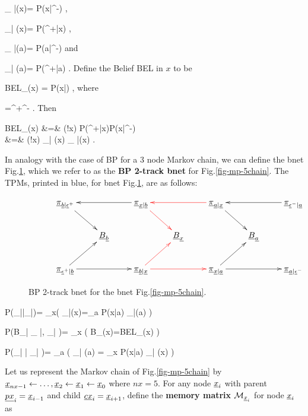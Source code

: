 \beq
\pi_{ \rvx|\rvb}(x)=
P(x|\eps^-)
\;,
\eeq

\beq
\pi_{\rvb| \rvx}(x)=
P(\eps^+|x)
\;,
\eeq

\beq
\pi_{ \rva|\rvx}(a)=
P(a|\eps^-)
\;
\eeq
and

\beq
\pi_{\rvx| \rva}(a)=
P(\eps^+|a)
\;.
\eeq
Define the Belief BEL in $x$ to be

\beq
BEL_\rvx(x)
=
P(x|\eps)
\;,
\eeq
where

\beq
\rveps=\rveps^+\cup\rveps^-
\;.
\eeq
Then


\beqa
BEL_\rvx(x)
&=&
\caln(!x)
P(\eps^+|x)P(x|\eps^-)
\\
&=&
\caln(!x)
\pi_{\rvb| \rvx}(x)
\pi_{ \rvx|\rvb}(x)
\;.
\eeqa

In analogy
with the case of BP for a 3 node Markov
chain, we can define the bnet
Fig.\ref{fig-BEL-4pi},
which we refer to as the
{\bf BP
2-track bnet} for Fig.\ref{fig-mp-5chain}.
The TPMs, printed in blue,
 for bnet Fig.\ref{fig-BEL-4pi}, are
as follows:





\begin{figure}[h!]
$$\xymatrix{
&\ul{\pi}_{\rvb|\rveps^+}\ar[dr]
&&\ul{\pi}_{\rvx|\rvb}\ar[ll]\ar@[red][dr]
&&\ul{\pi}_{\rva|\rvx}\ar@[red][ll]\ar[dr]
&&\ul{\pi}_{\rveps^-|\rva}\ar[ll]
\\
&&\rvB_\rvb
&&\rvB_\rvx
&&\rvB_\rva
\\
&\ul{\pi}_{\rveps^+|\rvb}\ar[rr]\ar[ur]
&&\ul{\pi}_{\rvb|\rvx}\ar@[red][rr]\ar@[red][ur]
&&\ul{\pi}_{\rvx|\rva}\ar[rr]\ar[ur]
&&\ul{\pi}_{\rva|\rveps^-}
}$$
\caption{BP 2-track bnet for the bnet
Fig.\ref{fig-mp-5chain}.}
\label{fig-BEL-4pi}
\end{figure}


\beq\color{blue}
P(\pi_{\rvx|\rvb}|\pi_{\rva|\rvx})=
\prod_{x}\indi\left(
\pi_{\rvx|\rvb}(x)=\sum_a P(x|a)
\pi_{\rva|\rvx}(a)
\right)
\label{eq-pr-pi-bar-pi}
\eeq

\beq\color{blue}
P(B_\rvx|
\pi_{ \rvx|\rvb},
\pi_{\rvb| \rvx})=
\prod_x
\indi\left(
B_\rvx(x)=BEL_\rvx(x)
\right)
\eeq

\beq\color{blue}
P(\pi_{\rvx| \rva}|
\pi_{\rvb| \rvx})=
\prod_{a}
\indi\left(
\pi_{\rvx| \rva}(a)
=
\sum_x P(x|a)
\pi_{\rvb| \rvx}(x)
\right)
\label{eq-pr-lam-bar-lam}
\eeq

Let us represent the Markov
chain of Fig.\ref{fig-mp-5chain}
by
$\rvx_{nx-1}
\larrow \ldots, \rvx_2\larrow \rvx_1\larrow \rvx_0$
where $nx=5$.
For any node
$\rvx_i$
with
parent $\ul{px}_i=\rvx_{i-1}$
and child $\ul{cx}_i=\rvx_{i+1}$,
define
the {\bf memory matrix}
$\calm_{\rvx_i}$
for node $\rvx_i$
as


